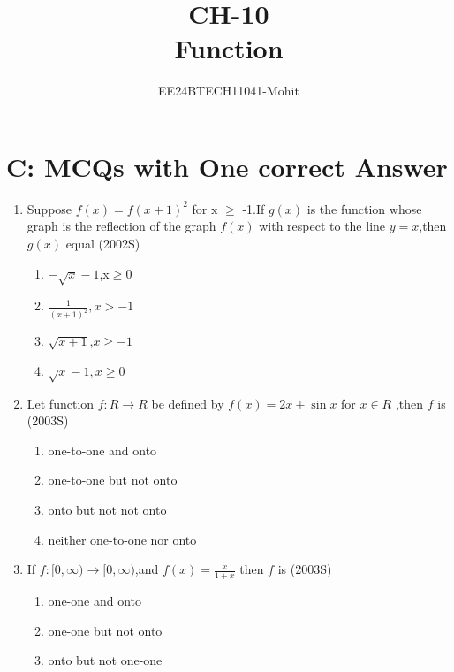 \documentclass[journal,12pt,twocolumn]{IEEEtran}
\theoremstyle{remark}
\begin{document}

\vspace{3cm}

\title{CH-10\\ Function}
\author{EE24BTECH11041-Mohit}
\maketitle
\newpage
\bigskip

\renewcommand{\thefigure}{\theenumi}
\renewcommand{\thetable}{\theenumi}

\section {C: MCQs with One correct Answer}
\begin{enumerate}
\item Suppose $f(x)=f(x+1)^2 $ for x $\geq$ -1.If $g(x)$ is the   function whose graph is the reflection of the graph $f(x)$ with respect to the line $y=x$,then $g(x)$ equal
\hfill(2002S)\\
\begin{multicols}{2}
\begin{enumerate}
    \item $-\sqrt{x}-1$,x$\geq$0
    \item $\frac{1}{(x+1)^2},x>-1$
    \item $\sqrt{x+1}$,$x\geq-1$
    \item $\sqrt{x} -1,x\geq 0$
\end{enumerate}
\end{multicols}
\item Let function $f:R\rightarrow R$ be defined by $f(x)=2x + \sin x$ for $x\in R$ ,then $f$ is
\hfill(2003S)\\
\begin{enumerate}
    \item one-to-one and onto
    \item one-to-one but not onto
    \item onto but not not onto
    \item neither one-to-one nor onto
\end{enumerate}
\item If $f:[0,\infty) \rightarrow [0,\infty)$,and $f(x)=\frac{x}{1+x}$ then $f$ is
\hfill(2003S)\\
\begin{enumerate}
    \item one-one and onto
    \item one-one but not onto
    \item onto but not one-one

\end{enumerate}
\end{enumerate}
\end{document}
